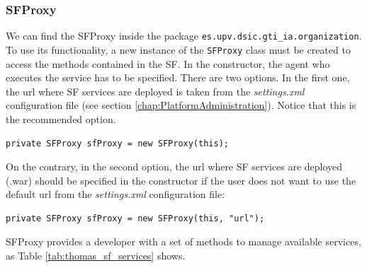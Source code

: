 \subsubsection{SFProxy}
We can find the SFProxy inside the package \lstinline|es.upv.dsic.gti_ia.organization|. To use its functionality, a new instance of the \lstinline|SFProxy| class must be created to access the methods contained in the SF. In the constructor, the agent who executes the service has to be specified. There are two options. In the first one, the url where SF services are deployed is taken from the \textit{settings.xml} configuration file (see section \ref{chap:PlatformAdministration}). Notice that this is the recommended option.

\begin{lstlisting}
private SFProxy sfProxy = new SFProxy(this);
\end{lstlisting}

On the contrary, in the second option, the url where SF services are deployed (.war) should be specified in the constructor if the user does not want to use the default url from the \textit{settings.xml} configuration file:

\begin{lstlisting}
private SFProxy sfProxy = new SFProxy(this, "url");
\end{lstlisting}


SFProxy provides a developer with a set of methods to manage available services, as Table \ref{tab:thomas_sf_services} shows.


